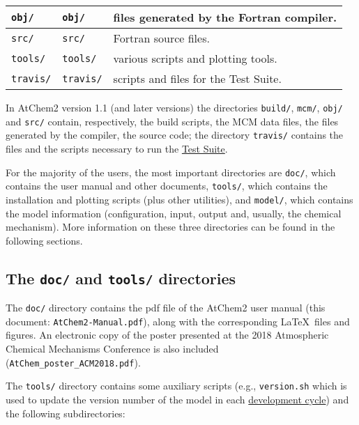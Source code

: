 \begin{table}[htb]
\begin{tabular}{llp{3.7cm}}
    \hline
    \texttt{obj/}                    & \texttt{obj/}                           & files generated by the Fortran compiler.\\
    \hline
    \texttt{src/}                    & \texttt{src/}                           & Fortran source files.\\
    \hline
    \texttt{tools/}                  & \texttt{tools/}                         & various scripts and plotting tools.\\
    \hline
    \texttt{travis/}                 & \texttt{travis/}                        & scripts and files for the Test Suite.\\
  \end{tabular}
\end{table}

In AtChem2 version 1.1 (and later versions) the directories
\texttt{build/}, \texttt{mcm/}, \texttt{obj/} and \texttt{src/}
contain, respectively, the build scripts, the MCM data files, the
files generated by the compiler, the source code; the directory
\texttt{travis/} contains the files and the scripts necessary to run
the \hyperref[sec:test-suite]{Test Suite}.

For the majority of the users, the most important directories are
\texttt{doc/}, which contains the user manual and other documents,
\texttt{tools/}, which contains the installation and plotting scripts
(plus other utilities), and \texttt{model/}, which contains the model
information (configuration, input, output and, usually, the chemical
mechanism). More information on these three directories can be found
in the following sections.

\subsection{The \texttt{doc/} and \texttt{tools/} directories} \label{subsec:doc-tools-directories}

The \texttt{doc/} directory contains the pdf file of the AtChem2 user
manual (this document: \texttt{AtChem2-Manual.pdf}), along with the
corresponding \LaTeX\ files and figures. An electronic copy of the
poster presented at the 2018 Atmospheric Chemical Mechanisms
Conference \citep{sommariva_2018} is also included
(\texttt{AtChem\_poster\_ACM2018.pdf}).

The \texttt{tools/} directory contains some auxiliary scripts (e.g.,
\texttt{version.sh} which is used to update the version number of the
model in each \hyperref[ch:development]{development cycle}) and the
following subdirectories:


